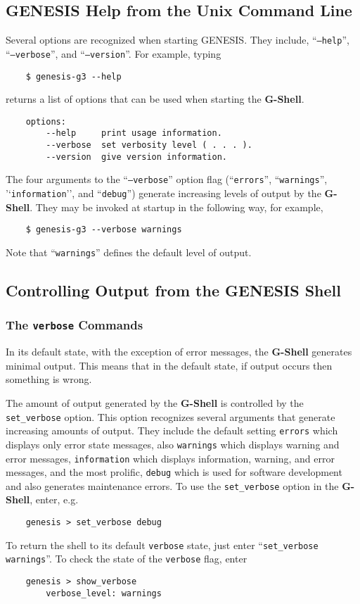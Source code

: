 \documentclass[12pt]{article}
\begin{document}


\subsection*{GENESIS Help from the Unix Command Line}
Several options are recognized when starting GENESIS. They include, ``{\tt --help}'', ``{\tt --verbose}'', and ``{\tt --version}''. For example, typing
\begin{verbatim}
    $ genesis-g3 --help
\end{verbatim}
returns a list of options that can be used when starting the {\bf G-Shell}.
\begin{verbatim}
    options:
        --help     print usage information.
        --verbose  set verbosity level ( . . . ).
        --version  give version information.
\end{verbatim}
The four arguments to the ``{\tt --verbose}'' option flag (``{\tt errors}'', ``{\tt warnings}'', '`{\tt information}'', and ``{\tt debug}'') generate increasing levels of output by the {\bf G-Shell}. They may be invoked at startup in the following way, for example,
\begin{verbatim}
    $ genesis-g3 --verbose warnings
\end{verbatim}
Note that ``{\tt warnings}'' defines the default level of output.

\subsection*{Controlling Output from the GENESIS Shell}

\subsubsection*{The {\tt verbose} Commands}

In its default state, with the exception of error messages, the {\bf G-Shell} generates minimal output. This means that in the default state, if output occurs then something is wrong.

The amount of output generated by the {\bf G-Shell} is controlled by the {\tt set\_verbose} option.  This option recognizes several arguments that generate increasing amounts of output. They include the default setting {\tt errors} which displays only error state messages, also {\tt warnings} which displays warning and error messages, {\tt information} which displays information, warning, and error messages, and the most prolific, {\tt debug} which is used for software development and also generates maintenance errors. To use the {\tt set\_verbose} option in the {\bf G-Shell}, enter, e.g.
\begin{verbatim}
    genesis > set_verbose debug
\end{verbatim}
To return the shell to its default {\tt verbose} state, just enter ``{\tt set\_verbose warnings}''.  To check the state of the {\tt verbose} flag, enter
\begin{verbatim}
    genesis > show_verbose
        verbose_level: warnings
\end{verbatim}
\end{document}
